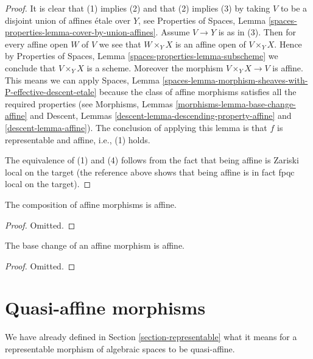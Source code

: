 \begin{proof}
It is clear that (1) implies (2) and that (2) implies (3) by taking
$V$ to be a disjoint union of affines \'etale over $Y$, see
Properties of Spaces,
Lemma \ref{spaces-properties-lemma-cover-by-union-affines}.
Assume $V \to Y$ is as in (3). Then for every affine open $W$ of $V$ we see
that $W \times_Y X$ is an affine open of $V \times_Y X$. Hence by
Properties of Spaces, Lemma \ref{spaces-properties-lemma-subscheme}
we conclude that $V \times_Y X$ is a scheme. Moreover the morphism
$V \times_Y X \to V$ is affine. This means we can apply
Spaces,
Lemma \ref{spaces-lemma-morphism-sheaves-with-P-effective-descent-etale}
because the class of affine morphisms satisfies all the required
properties (see
Morphisms, Lemmas \ref{morphisms-lemma-base-change-affine} and
Descent, Lemmas \ref{descent-lemma-descending-property-affine}
and \ref{descent-lemma-affine}). The conclusion of applying this lemma
is that $f$ is representable and affine, i.e., (1) holds.

\medskip\noindent
The equivalence of (1) and (4) follows from the fact that being
affine is Zariski local on the target (the reference above shows
that being affine is in fact fpqc local on the target).
\end{proof}

\begin{lemma}
\label{lemma-composition-affine}
The composition of affine morphisms is affine.
\end{lemma}

\begin{proof}
Omitted.
\end{proof}

\begin{lemma}
\label{lemma-base-change-affine}
The base change of an affine morphism is affine.
\end{lemma}

\begin{proof}
Omitted.
\end{proof}









\section{Quasi-affine morphisms}
\label{section-quasi-affine}

\noindent
We have already defined in Section \ref{section-representable}
what it means for a representable morphism of algebraic spaces
to be quasi-affine.


